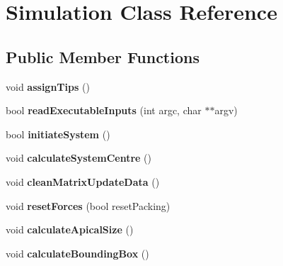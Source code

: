 \hypertarget{classSimulation}{}\section{Simulation Class Reference}
\label{classSimulation}
\subsection*{Public Member Functions}
\begin{DoxyCompactItemize}
\item 
\hypertarget{classSimulation_a7ed75e3d044166072754e6e323f3604c}{}void {\bfseries assign\+Tips} ()\label{classSimulation_a7ed75e3d044166072754e6e323f3604c}

\item 
\hypertarget{classSimulation_aa5c031b9d4c6b3d74f636adec0b695ed}{}bool {\bfseries read\+Executable\+Inputs} (int argc, char $\ast$$\ast$argv)\label{classSimulation_aa5c031b9d4c6b3d74f636adec0b695ed}

\item 
\hypertarget{classSimulation_ae44910ca27d6ec5eaa48f7136fad87ea}{}bool {\bfseries initiate\+System} ()\label{classSimulation_ae44910ca27d6ec5eaa48f7136fad87ea}

\item 
\hypertarget{classSimulation_a1f9bf054812136067d30e79345f877de}{}void {\bfseries calculate\+System\+Centre} ()\label{classSimulation_a1f9bf054812136067d30e79345f877de}

\item 
\hypertarget{classSimulation_aa8fb138f6057956ce2b6e02fbcb0254f}{}void {\bfseries clean\+Matrix\+Update\+Data} ()\label{classSimulation_aa8fb138f6057956ce2b6e02fbcb0254f}

\item 
\hypertarget{classSimulation_a5c0989e1c64b0fde348701454e9fbf67}{}void {\bfseries reset\+Forces} (bool reset\+Packing)\label{classSimulation_a5c0989e1c64b0fde348701454e9fbf67}

\item 
\hypertarget{classSimulation_a8e6ec9457aa61d2493747d0110a50ca5}{}void {\bfseries calculate\+Apical\+Size} ()\label{classSimulation_a8e6ec9457aa61d2493747d0110a50ca5}

\item 
\hypertarget{classSimulation_a4950a649e48408ad5756acd9c2718665}{}void {\bfseries calculate\+Bounding\+Box} ()\label{classSimulation_a4950a649e48408ad5756acd9c2718665}


\end{DoxyCompactItemize}
